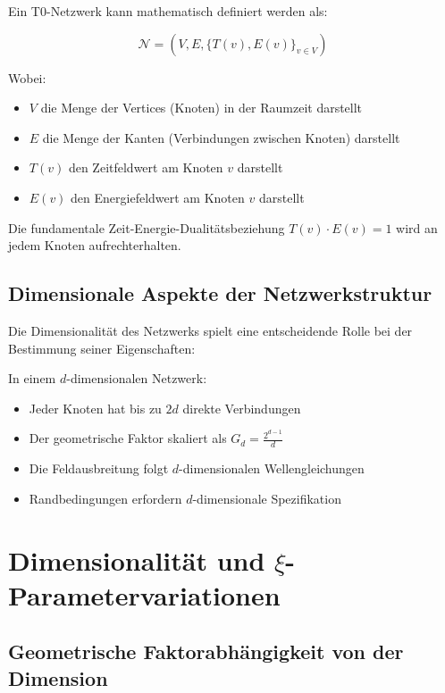 \documentclass[12pt,a4paper]{article}
\begin{document}
	Ein T0-Netzwerk kann mathematisch definiert werden als:
	
	\begin{equation}
		\mathcal{N} = (V, E, \{T(v), E(v)\}_{v \in V})
	\end{equation}
	
	Wobei:
	\begin{itemize}
		\item $V$ die Menge der Vertices (Knoten) in der Raumzeit darstellt
		\item $E$ die Menge der Kanten (Verbindungen zwischen Knoten) darstellt
		\item $T(v)$ den Zeitfeldwert am Knoten $v$ darstellt
		\item $E(v)$ den Energiefeldwert am Knoten $v$ darstellt
	\end{itemize}
	
	Die fundamentale Zeit-Energie-Dualitätsbeziehung $T(v) \cdot E(v) = 1$ wird an jedem Knoten aufrechterhalten.
	
	\subsection{Dimensionale Aspekte der Netzwerkstruktur}
	\label{subsec:dimensional_aspects}
	
	Die Dimensionalität des Netzwerks spielt eine entscheidende Rolle bei der Bestimmung seiner Eigenschaften:
	
	\begin{tcolorbox}[colback=blue!5!white,colframe=blue!75!black,title=Dimensionale Netzwerkeigenschaften]
		In einem $d$-dimensionalen Netzwerk:
		\begin{itemize}
			\item Jeder Knoten hat bis zu $2d$ direkte Verbindungen
			\item Der geometrische Faktor skaliert als $G_d = \frac{2^{d-1}}{d}$
			\item Die Feldausbreitung folgt $d$-dimensionalen Wellengleichungen
			\item Randbedingungen erfordern $d$-dimensionale Spezifikation
		\end{itemize}
	\end{tcolorbox}
	
	\section{Dimensionalität und $\xi$-Parametervariationen}
	\label{sec:dimensionality_xi}
	
	\subsection{Geometrische Faktorabhängigkeit von der Dimension}
	\label{subsec:geometric_factor}
	
\end{document}
